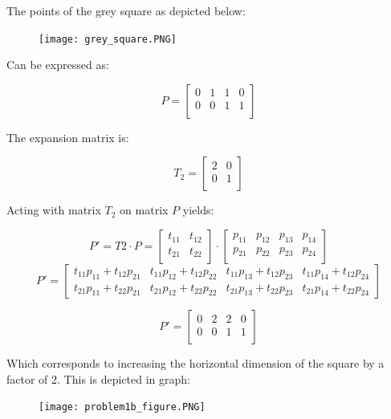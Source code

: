 \documentclass{article}
\begin{document}
The points of the grey square as depicted below:

\begin{figure}[!htb]
  \centering
  \texttt{[image: grey\_square.PNG]}
  \label{fig3}
\end{figure}

Can be expressed as:

\[P = 
\begin{bmatrix}
    0 & 1 & 1 & 0 \\
    0 & 0 & 1 & 1 \\
\end{bmatrix}
\]

The expansion matrix is:

\[T_{2} = 
\begin{bmatrix}
    2 & 0  \\
    0 & 1  \\
\end{bmatrix}
\]

Acting with matrix $T_2$ on matrix $P$ yields:

\[ 
P' = T2 \cdot P = \begin{bmatrix}
t_{11} & t_{12} \\
t_{21} & t_{22} \\
\end{bmatrix} \cdot \begin{bmatrix}
p_{11} & p_{12} & p_{13} & p_{14} \\
p_{21} & p_{22} & p_{23} & p_{24} \\
\end{bmatrix}
\]
\[P' =  
\begin{bmatrix}
    t_{11}p_{11} + t_{12}p_{21} & t_{11}p_{12} + t_{12}p_{22} & t_{11}p_{13} + t_{12}p_{23} & t_{11}p_{14} + t_{12}p_{24} \\
    t_{21}p_{11} + t_{22}p_{21} & t_{21}p_{12} + t_{22}p_{22} & t_{21}p_{13} + t_{22}p_{23} & t_{21}p_{14} + t_{22}p_{24}
\end{bmatrix}
\]

\[P' = 
\begin{bmatrix}
    0 & 2 & 2 & 0 \\
    0 & 0 & 1 & 1 \\
\end{bmatrix}
\]

Which corresponds to increasing the horizontal dimension of the square by a factor of 2. This is depicted in graph:

\begin{figure}[!htb]
  \centering
  \texttt{[image: problem1b\_figure.PNG]}
  \label{fig3}
\end{figure}
\end{document}
